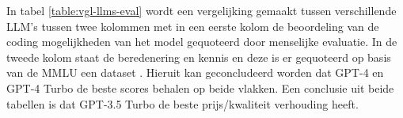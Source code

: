 \begin{table}[h!]
\centering
{}
\caption{Vergelijking LLM's op basis van beoordeling van menselijke evaluatie en MMLU \autocite{ArtificialAnalysis2024}}
\label{table:vgl-llms-eval}
\end{table}

In tabel \ref{table:vgl-llms-eval} wordt een vergelijking gemaakt tussen verschillende LLM's tussen twee kolommen met in een eerste kolom de beoordeling van de coding mogelijkheden van het model gequoteerd door menselijke evaluatie. 
In de tweede kolom staat de beredenering en kennis en deze is er gequoteerd op basis van de MMLU een dataset \autocite{Hendrycks2020}.
Hieruit kan geconcludeerd worden dat GPT-4 en GPT-4 Turbo de beste scores behalen op beide vlakken.
Een conclusie uit beide tabellen is dat GPT-3.5 Turbo de beste prijs/kwaliteit verhouding heeft.